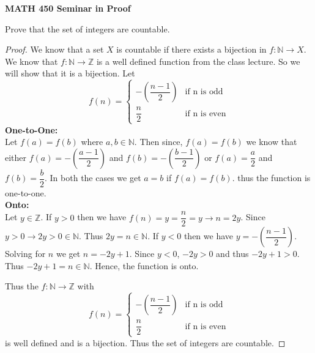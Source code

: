 \documentclass[14pt]{article}
\newcommand{\Z}{\mathbb Z}
\newcommand{\N}{\mathbb N}
\begin{document}
\begin{center}
		
{\bf MATH 450 Seminar in Proof}
 \\
\end{center}
	Prove that the set of integers are countable.
\begin{proof}
	 We know that a set $X$ is countable if there exists a bijection in $f: \N \rightarrow X$. We know that $f:\N \rightarrow \Z$ is a well defined function from the class lecture. So we will show that it is a bijection. 
	 Let \[
f(n) =
\begin{cases}
 - \left( \dfrac{n-1}{2} \right) & \text{if n is odd} \\
 \dfrac{n}{2} & \text{if n is even}
\end{cases}
\]
\textbf{One-to-One: \\}
Let $f(a) = f(b)$ where $a,b \in \N$. Then since, $f(a)= f(b)$ we know that either $f(a) = - \left( \dfrac{a-1}{2} \right)$ and $f(b) = - \left( \dfrac{b-1}{2} \right)$ or $f(a) = \dfrac{a}{2}$ and $f(b) = \dfrac{b}{2}$. In both the cases we get $a=b$ if $f(a) = f(b)$. thus the function is one-to-one.\\ \textbf{Onto: \\}
Let $y \in \Z$. If $y > 0$ then we have $f(n) = y = \dfrac{n}{2} = y \rightarrow n = 2y$. Since $y > 0 \rightarrow 2y >0 \in \N$. Thus $2y = n \in \N$. If $y < 0$ then we have $ y = - \left( \dfrac{n-1}{2} \right)$. Solving for $n$ we get $n = -2y + 1$. Since $y <0$, $-2y > 0$ and thus $-2y + 1 > 0$. Thus $-2y+1 = n \in \N$. Hence, the function is onto.

Thus the $f:\N \rightarrow \Z$ with \[
f(n) =
\begin{cases}
 - \left( \dfrac{n-1}{2} \right) & \text{if n is odd} \\
 \dfrac{n}{2} & \text{if n is even}
\end{cases}
\] is well defined and is a bijection. Thus the set of integers are countable.
\end{proof}
\end{document}
